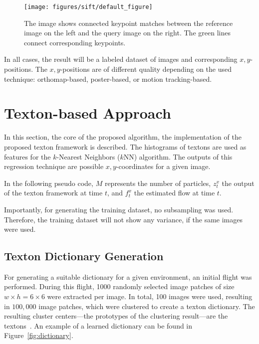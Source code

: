\begin{figure}[h!]
\begin{center}
\texttt{[image: figures/sift/default\_figure]}
\caption{{\label{fig:homography} The
    image shows connected keypoint matches between the reference image
    on the left and the query image on the right. The green lines
    connect corresponding keypoints.%
}}
\end{center}
\end{figure}

In all cases, the result will be a labeled dataset of images and corresponding $x,y$-positions. The $x,y$-positions are of different quality depending on the used technique: orthomap-based, poster-based, or motion tracking-based. 


\section{Texton-based Approach}
\label{sec:textons}

In this section, the core of the proposed algorithm, the
implementation of the proposed texton framework is described.  The
histograms of textons are used as features for the $k$-Nearest
Neighbors ($k$NN) algorithm. The outputs of this regression technique
are possible $x,y$-coordinates for a given image.

In the following pseudo code, $M$ represents the number of particles,
$z_t^x$ the output of the texton framework at time $t$, and $f_t^x$
the estimated flow at time $t$.


Importantly, for generating the training dataset, no subsampling was
used. Therefore, the training dataset will not show any variance, if
the same images were used.

\subsection{Texton Dictionary Generation}
\label{sec:text-dict-gener}

For generating a suitable dictionary for a given environment, an
initial flight was performed. During this flight, 1000 randomly
selected image patches of size $w \times h = 6 \times 6$ were
extracted per image. In total, 100 images were used, resulting in
$100,000$ image patches, which were clustered to create a texton
dictionary. The resulting cluster centers---the prototypes of the
clustering result---are the textons~\cite{varma2003texture}. An
example of a learned dictionary can be found in
Figure~\ref{fig:dictionary}.

